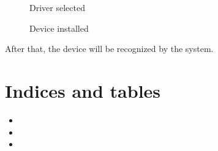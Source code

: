 \documentclass[letterpaper,10pt,english]{sphinxmanual}
\begin{document}
\begin{figure}[htbp]
\centering
\capstart

\noindent{}
\caption{Driver selected}\label{\detokenize{error:id3}}\label{\detokenize{error:figure-install-driver}}\end{figure}

\begin{figure}[htbp]
\centering
\capstart

\noindent{}
\caption{Device installed}\label{\detokenize{error:id4}}\label{\detokenize{error:figure-device-success}}\end{figure}

\sphinxAtStartPar
After that, the device will be recognized by the system.


\chapter{Indices and tables}
\label{\detokenize{index:indices-and-tables}}\begin{itemize}
\item {} 
\sphinxAtStartPar
{}

\item {} 
\sphinxAtStartPar
{}

\item {} 
\sphinxAtStartPar
{}

\end{itemize}



\renewcommand{\indexname}{Index}
\printindex
\end{document}
